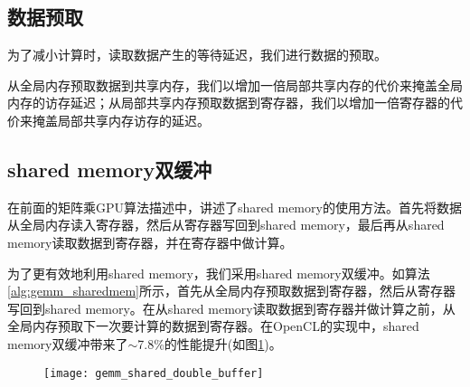 \subsection{数据预取}
为了减小计算时，读取数据产生的等待延迟，我们进行数据的预取。

从全局内存预取数据到共享内存，我们以增加一倍局部共享内存的代价来掩盖全局内存的访存延迟；从局部共享内存预取数据到寄存器，我们以增加一倍寄存器的代价来掩盖局部共享内存访存的延迟。

\subsection{shared memory双缓冲}
在前面的矩阵乘GPU算法描述中，讲述了shared memory的使用方法。首先将数据从全局内存读入寄存器，然后从寄存器写回到shared memory，最后再从shared memory读取数据到寄存器，并在寄存器中做计算。

为了更有效地利用shared memory，我们采用shared memory双缓冲。如算法\ref{alg:gemm_sharedmem}所示，首先从全局内存预取数据到寄存器，然后从寄存器写回到shared memory。在从shared memory读取数据到寄存器并做计算之前，从全局内存预取下一次要计算的数据到寄存器。在OpenCL的实现中，shared memory双缓冲带来了$\sim$7.8\%的性能提升(如图\ref{fig:gemm_shared_double_buffer})。
\begin{figure}[htbp]
	\centering
	\texttt{[image: gemm\_shared\_double\_buffer]}
	\label{fig:gemm_shared_double_buffer}
\end{figure}


